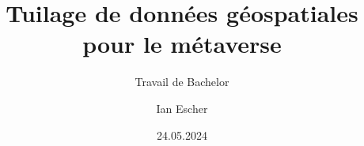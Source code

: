 \author{Ian Escher}


\title{Tuilage de données géospatiales pour le métaverse}

\subtitle{Travail de Bachelor}


\date{24.05.2024}

\thesis{-}

